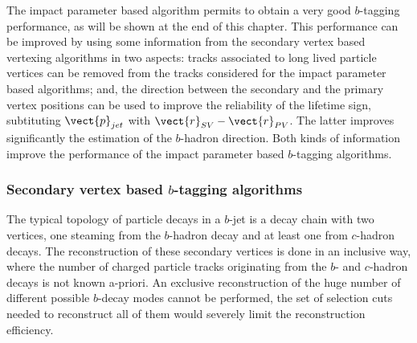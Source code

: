 The impact parameter based algorithm permits to obtain a very good $b$-tagging performance, as will be shown at the end of this chapter. 
This performance can be improved by using some information from the secondary vertex based vertexing algorithms in two aspects: tracks associated to long lived particle vertices can be removed from the tracks considered for the impact parameter based algorithms; and, the direction between the secondary and the primary vertex positions can be used to improve the reliability of the lifetime sign, subtituting $\vect{p}_{jet}$ with $\vect{r}_{SV} - \vect{r}_{PV} $. The latter improves significantly the estimation of the $b$-hadron direction. Both kinds of information improve the performance of the impact parameter based $b$-tagging algorithms.


\subsubsection{Secondary vertex based $b$-tagging algorithms }

The typical topology of particle decays in a $b$-jet is a decay chain with two vertices, one steaming from the $b$-hadron decay and at least one from $c$-hadron decays. The reconstruction of these secondary vertices is done in an inclusive way, where the number of charged particle tracks originating from the $b$- and $c$-hadron decays is not known a-priori. An exclusive reconstruction of the huge number of different possible $b$-decay modes cannot be performed, the set of selection cuts needed to reconstruct all of them would severely limit the reconstruction efficiency.

